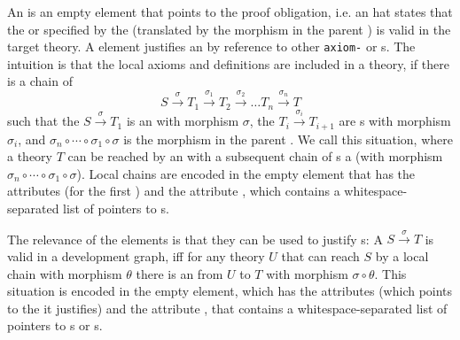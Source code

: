 An {} is an empty element that points to the proof obligation,
i.e. an {} hat states that the {} or
{} specified by the {}
(translated by the morphism in the parent {}) is valid in
the target theory. A {} element justifies an
{} by reference to other {\tt{axiom-}} or
{s}. The intuition is that the local axioms and
definitions are included in a theory, if there is a chain of
\[S\stackrel\sigma\longrightarrow 
  T_1\stackrel{\sigma_1}\longrightarrow 
  T_2\stackrel{\sigma_2}\longrightarrow  \ldots 
  T_n\stackrel{\sigma_n}\longrightarrow T
\]
such that the $S\stackrel\sigma\longrightarrow T_1$ is an
{} with morphism $\sigma$, the
$T_i\stackrel{\sigma_i}\longrightarrow T_{i+1}$ are {s}
with morphism $\sigma_i$, and $\sigma_n\circ\cdots\circ\sigma_1\circ\sigma$ is the
morphism in the parent {}. We call this situation, where
a theory $T$ can be reached by an {} with a subsequent
chain of {s} a {}
(with morphism $\sigma_n\circ\cdots\circ\sigma_1\circ\sigma$). Local chains are
encoded in the empty {} element that has the attributes
{} (for the first {}) and the
attribute {}, which contains a whitespace-separated
list of pointers to {s}.

The relevance of the {} elements is that they can be used
to justify {s}: A {}
$S\stackrel\sigma\longrightarrow T$ is valid in a development graph, iff for any
theory $U$ that can reach $S$ by a local chain with morphism $\theta$ there is an
{} from $U$ to $T$ with morphism $\sigma\circ\theta$.
This situation is encoded in the empty {}
{} element, which has the attributes
{} (which points to the {}
it justifies) and the attribute {}, that contains
a whitespace-separated list of pointers to {s} or
{s}.

